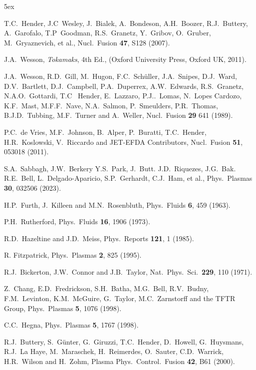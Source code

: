 \documentclass{iopjournal}
\begin{document}
\begin{thebibliography}{99}\baselineskip 5ex

 T.C.~Hender, J.C~Wesley, J.~Bialek, A.~Bondeson, A.H.~Boozer, R.J.~Buttery, A.~Garofalo, T.P~Goodman, R.S.~Granetz, Y.~Gribov, O.~Gruber, 
M.~Gryaznevich, et al., Nucl.\  Fusion {\bf 47}, S128 (2007).

 J.A.~Wesson, {\em Tokamaks}, 4th Ed., (Oxford University Press, Oxford UK, 2011).

 J.A.~Wesson, R.D.~Gill, M.~Hugon, F.C.~Sch\"{u}ller, J.A.~Snipes, D.J.~Ward, D.V.~Bartlett, D.J.~Campbell, P.A.~Duperrex, A.W.~Edwards, 
R.S.~Granetz, N.A.O.~Gottardi, T.C~ Hender, E.~Lazzaro, P.J..~Lomas, N.~Lopes Cardozo, K.F.~Mast, M.F.F.~Nave, N.A.~Salmon, P.~Smeulders, 
P.R.~Thomas, B.J.D.~Tubbing, M.F.~Turner and A.~Weller, Nucl.\ Fusion {\bf 29} 641 (1989). 

 P.C.~de Vries, M.F.~Johnson, B.~Alper, P.~Buratti, T.C.~Hender, H.R.~Koslowski, V.~Riccardo and JET-EFDA Contributors,  Nucl.\ Fusion {\bf 51},  053018 (2011).

 S.A.~Sabbagh, J.W.~Berkery  Y.S.~Park, J.~Butt. J.D.~Riquezes, J.G.~Bak. R.E.~Bell, L.~Delgado-Aparicio, S.P.~Gerhardt, C.J.~Ham,
et al., Phys.\ Plasmas {\bf 30}, 032506 (2023).

 H.P.~Furth,  J.~Killeen and M.N.~Rosenbluth,  Phys.\ Fluids {\bf 6}, 459 (1963).

 P.H.~Rutherford, Phys.\ Fluids {\bf 16}, 1906 (1973).

 R.D.~Hazeltine and J.D.~Meiss, Phys.\ Reports {\bf 121}, 1 (1985).

 R. Fitzpatrick, Phys.\ Plasmas {\bf 2}, 825 (1995).

 R.J.~Bickerton, J.W.~Connor and J.B.~Taylor, Nat.\ Phys.\ Sci.\ {\bf 229}, 110 (1971). 

 Z.~Chang,  E.D.~Fredrickson, S.H.~Batha,  M.G.~Bell,  R.V.~Budny,  F.M.~Levinton, K.M.~McGuire, G.~Taylor,  M.C.~Zarnstorff and the  TFTR Group, Phys.\ Plasmas {\bf 5}, 1076  (1998).

 C.C.~Hegna, Phys.\ Plasmas {\bf 5}, 1767 (1998).

 R.J.~Buttery, S.~G\"{u}nter, G.~Giruzzi, T.C.~Hender, D.~Howell, G.~Huysmans, R.J.~La Haye, M.~Maraschek, H.~Reimerdes, O.~Sauter,
 C.D.~Warrick, H.R.~Wilson and H.~Zohm, Plasma Phys.\ Control.\ Fusion {\bf 42}, B61 (2000).
 

\end{thebibliography}
\end{document}
